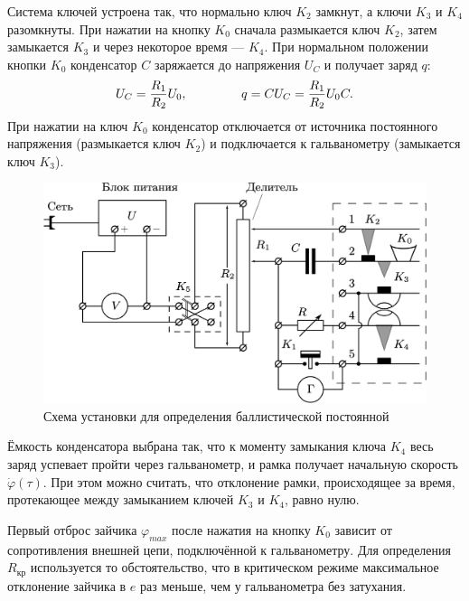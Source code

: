 \documentclass[a4paper, 12pt]{article}
\begin{document}
    Система ключей устроена так, что нормально ключ $K_2$ замкнут, а ключи $K_3$ и $K_4$ разомкнуты. При нажатии на кнопку $K_0$ сначала размыкается ключ $K_2$, затем замыкается $K_3$ и через некоторое время — $K_4$. При нормальном положении кнопки $K_0$ конденсатор $C$ заряжается до напряжения $U_C$ и получает заряд $q$:
    \begin{equation}
        U_C = \frac{R_1}{R_2} U_0, \hspace{1.5cm} q = C U_C = \frac{R_1}{R_2} U_0 C.
    \end{equation}
    При нажатии на ключ $K_0$ конденсатор отключается от источника постоянного напряжения (размыкается ключ $K_2$) и подключается к гальванометру (замыкается ключ $K_3$).
    
    \begin{figure}[ht]
        \centering
        \includegraphics[width=0.8\linewidth]{images/scheme2.png}
        \caption{Схема установки для определения баллистической постоянной}
        \label{pic2}
    \end{figure}
    
    Ёмкость конденсатора выбрана так, что к моменту замыкания ключа $K_4$ весь заряд успевает пройти через гальванометр, и рамка получает начальную скорость $\dot{\varphi}(\tau)$. При этом можно считать, что отклонение рамки, происходящее за время, протекающее между замыканием ключей $K_3$ и $K_4$, равно нулю.
    
    Первый отброс зайчика $\varphi_{max}$ после нажатия на кнопку $K_0$ зависит от сопротивления внешней цепи, подключённой к гальванометру. Для определения $R_{кр}$ используется то обстоятельство, что в критическом режиме максимальное отклонение зайчика в $e$ раз меньше, чем у гальванометра без затухания.
    
\end{document}
